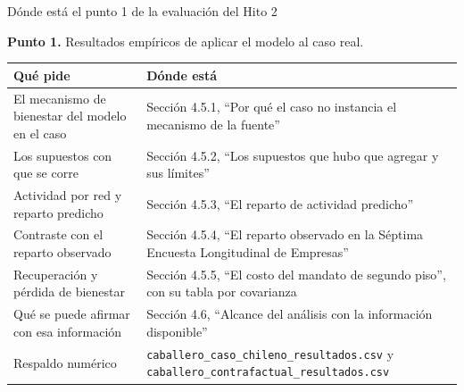 \documentclass[aspectratio=169]{beamer}
\begin{document}
\begin{frame}{Dónde está el punto 1 de la evaluación del Hito 2}

\footnotesize
\textbf{Punto 1.} Resultados empíricos de aplicar el modelo al caso real.

\vspace{0.3cm}
\begin{table}
\centering
\footnotesize
\begin{tabular}{p{5.3cm}p{6.4cm}}
\toprule
Qué pide & Dónde está \\
\midrule
El mecanismo de bienestar del modelo en el caso & Sección 4.5.1, ``Por qué el caso no instancia el mecanismo de la fuente'' \\
Los supuestos con que se corre & Sección 4.5.2, ``Los supuestos que hubo que agregar y sus límites'' \\
Actividad por red y reparto predicho & Sección 4.5.3, ``El reparto de actividad predicho'' \\
Contraste con el reparto observado & Sección 4.5.4, ``El reparto observado en la Séptima Encuesta Longitudinal de Empresas'' \\
Recuperación y pérdida de bienestar & Sección 4.5.5, ``El costo del mandato de segundo piso'', con su tabla por covarianza \\
Qué se puede afirmar con esa información & Sección 4.6, ``Alcance del análisis con la información disponible'' \\
\midrule
Respaldo numérico & \texttt{caballero\_caso\_chileno\_resultados.csv} y \texttt{caballero\_contrafactual\_resultados.csv} \\
\bottomrule
\end{tabular}
\end{table}

\end{frame}
\end{document}
